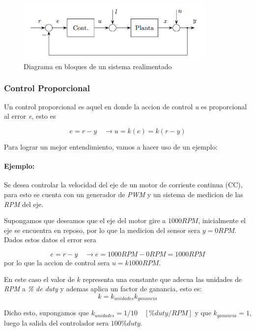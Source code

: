 \documentclass[10pt,conference,a4paper,onecolumn]{article}%
\begin{document}
\begin{figure}[h]
\centering
\includegraphics[height=3cm]{./imagenes/sis_realim_generico.png}
\caption{Diagrama en bloques de un sistema realimentado}
\label{fig:sis_generico}
\end{figure}


\subsubsection{Control Proporcional}
Un control proporcional es aquel en donde la accion de control \textit{u} es proporcional al error \textit{e}, esto es

\begin{equation}
e=r-y \quad \rightarrow u=k(e)=k (r-y)
\end{equation}

Para lograr un mejor entendimiento, vamos a hacer uso de un ejemplo:
\paragraph{Ejemplo:} Se desea controlar la velocidad del eje de un motor de corriente continua (CC), para esto se cuenta con un generador de \textit{PWM} y un sistema de medicion de las \textit{RPM} del eje.

Supongamos que deseamos que el eje del motor gire a $1000RPM$, inicialmente el eje se encuentra en reposo, por lo que la medicion del sensor sera $y=0RPM$. Dados estos datos el error sera

 \begin{equation*}
e=r-y \quad \rightarrow e=1000RPM - 0RPM =1000RPM
\end{equation*}
por lo que la accion de control sera $u=k 1000RPM$.

En este caso el valor de $k$ representa una constante que adecua las unidades de \textit{RPM} a \textit{\% de duty} y ademas aplica un factor de ganancia, esto es:
 \begin{equation*}
k=k_{unidades}k_{ganancia}
\end{equation*}
 
 Dicho esto, supongamos que $k_{unidades}=1/10 \quad [\%duty/RPM]$ y que $k_{ganancia}=1$, luego la salida del controlador sera $100 \%duty$.
 
\end{document}
